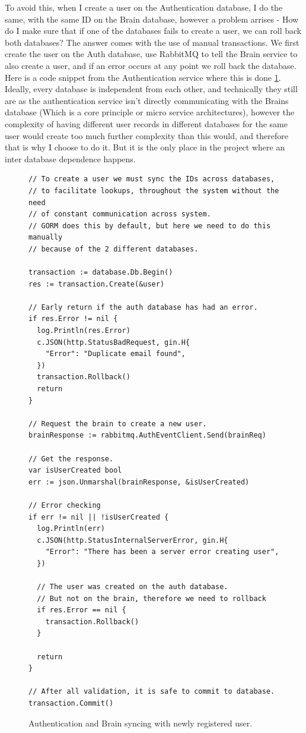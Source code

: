 \documentclass[titlepage]{article}
\begin{document}
To avoid this, when I create a user on the Authentication database, I do the same, with the same ID on the Brain database, however a problem arrises - How do I make sure that if one of the databases fails to create a user, we can roll back both databases? The answer comes with the use of manual transactions. We first create the user on the Auth database, use RabbitMQ to tell the Brain service to also create a user, and if an error occurs at any point we roll back the database. Here is a code snippet from the Authentication service where this is done \ref{auth_register_safe}. \\

Ideally, every database is independent from each other, and technically they still are as the authentication service isn't directly communicating with the Brains database (Which is a core principle or micro service architectures), however the complexity of having different user records in different databases for the same user would create too much further complexity than this would, and therefore that is why I choose to do it. But it is the only place in the project where an inter database dependence happens.

\begin{figure}
  \begin{verbatim}
// To create a user we must sync the IDs across databases,
// to facilitate lookups, throughout the system without the need
// of constant communication across system.
// GORM does this by default, but here we need to do this manually
// because of the 2 different databases.

transaction := database.Db.Begin()
res := transaction.Create(&user)

// Early return if the auth database has had an error.
if res.Error != nil {
  log.Println(res.Error)
  c.JSON(http.StatusBadRequest, gin.H{
    "Error": "Duplicate email found",
  })
  transaction.Rollback()
  return
}

// Request the brain to create a new user.
brainResponse := rabbitmq.AuthEventClient.Send(brainReq)

// Get the response.
var isUserCreated bool
err := json.Unmarshal(brainResponse, &isUserCreated)

// Error checking
if err != nil || !isUserCreated {
  log.Println(err)
  c.JSON(http.StatusInternalServerError, gin.H{
    "Error": "There has been a server error creating user",
  })

  // The user was created on the auth database.
  // But not on the brain, therefore we need to rollback
  if res.Error == nil {
    transaction.Rollback()
  }

  return
}

// After all validation, it is safe to commit to database.
transaction.Commit()
  \end{verbatim}
  \caption{Authentication and Brain syncing with newly registered user.}
  \label{auth_register_safe}
\end{figure}
\end{document}
